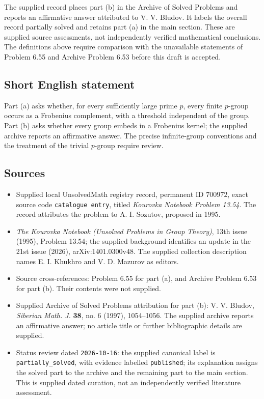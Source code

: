 \documentclass[11pt]{article}
\begin{document}
The supplied record places part (b) in the Archive of Solved Problems and reports an affirmative answer attributed to V. V. Bludov. It labels the overall record partially solved and retains part (a) in the main section. These are supplied source assessments, not independently verified mathematical conclusions. The definitions above require comparison with the unavailable statements of Problem 6.55 and Archive Problem 6.53 before this draft is accepted.
\subsection{Short English statement}
Part (a) asks whether, for every sufficiently large prime \(p\), every finite \(p\)-group occurs as a Frobenius complement, with a threshold independent of the group. Part (b) asks whether every group embeds in a Frobenius kernel; the supplied archive reports an affirmative answer. The precise infinite-group conventions and the treatment of the trivial \(p\)-group require review.
\subsection{Sources}
\begin{itemize}
\item Supplied local UnsolvedMath registry record, permanent ID \(700972\), exact source code \texttt{catalogue entry}, titled \emph{Kourovka Notebook Problem 13.54}. The record attributes the problem to A. I. Sozutov, proposed in 1995.
\item \emph{The Kourovka Notebook (Unsolved Problems in Group Theory)}, 13th issue (1995), Problem 13.54; the supplied background identifies an update in the 21st issue (2026), arXiv:1401.0300v48. The supplied collection description names E. I. Khukhro and V. D. Mazurov as editors.
\item Source cross-references: Problem 6.55 for part (a), and Archive Problem 6.53 for part (b). Their contents were not supplied.
\item Supplied Archive of Solved Problems attribution for part (b): V. V. Bludov, \emph{Siberian Math. J.} \textbf{38}, no. 6 (1997), 1054--1056. The supplied archive reports an affirmative answer; no article title or further bibliographic details are supplied.
\item Status review dated \texttt{2026-10-16}: the supplied canonical label is \texttt{partially\_solved}, with evidence labelled \texttt{published}; its explanation assigns the solved part to the archive and the remaining part to the main section. This is supplied dated curation, not an independently verified literature assessment.
\end{itemize}
\end{document}
